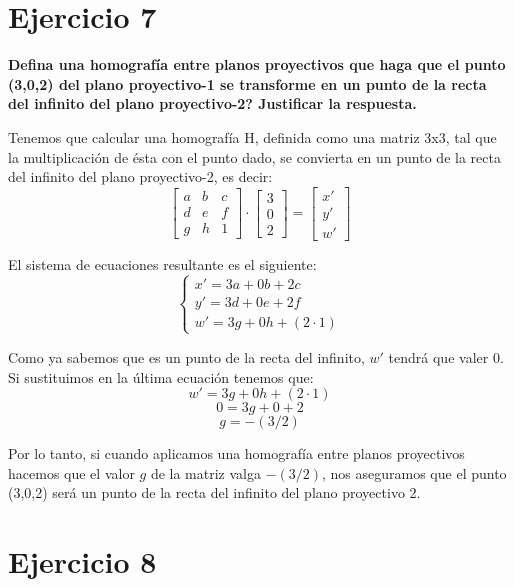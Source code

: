 \documentclass[11pt,a4paper]{article}
\begin{document}
\section*{Ejercicio 7}
\textbf{Defina una homografía entre planos proyectivos que haga que el punto (3,0,2) del plano proyectivo-1 se transforme en un punto de la recta del
infinito del plano proyectivo-2? Justificar la respuesta.}

Tenemos que calcular una homografía H, definida como una matriz 3x3, tal que la multiplicación de ésta con el punto dado, se convierta en un punto de
la recta del infinito del plano proyectivo-2, es decir:
\begin{equation*}
\begin{bmatrix}a & b & c\\d & e & f \\g & h & 1\end{bmatrix}\cdot \begin{bmatrix}3\\0\\2\end{bmatrix} = \begin{bmatrix}x'\\y'\\w'\end{bmatrix}
\end{equation*}

El sistema de ecuaciones resultante es el siguiente:
\begin{equation*}\left\{\begin{matrix}
x' = 3a+0b+2c\\ 
y' = 3d+0e+2f\\ 
w' = 3g+0h+(2\cdot 1)
\end{matrix}\right.\end{equation*}

Como ya sabemos que es un punto de la recta del infinito, $w'$ tendrá que valer 0. Si sustituimos en la última ecuación tenemos que:
$$w' = 3g+0h+(2\cdot1)$$
$$0  = 3g+0+2$$
$$g = -(3/2)$$

Por lo tanto, si cuando aplicamos una homografía entre planos proyectivos hacemos que el valor $g$ de la matriz valga $-(3/2)$, nos aseguramos que el
punto (3,0,2) será un punto de la recta del infinito del plano proyectivo 2.


\section*{Ejercicio 8}
\textbf{}
\end{document}
